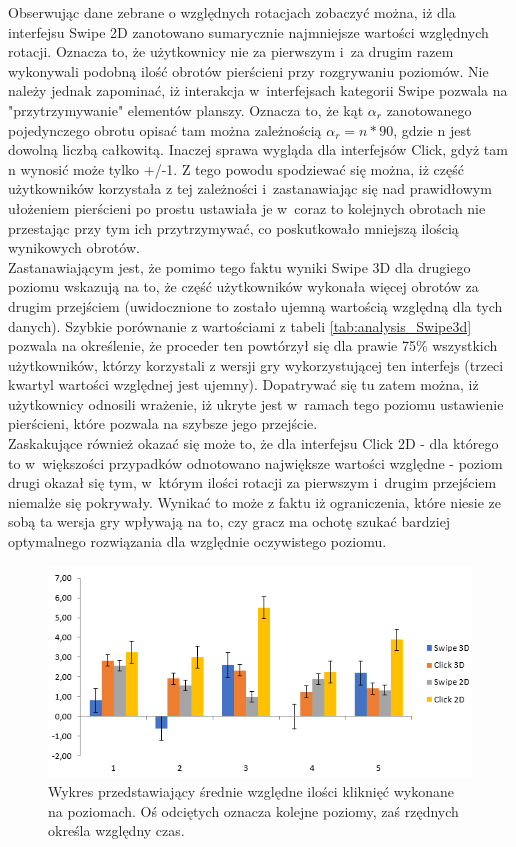 \documentclass[a4paper,12pt,numbers=noenddot]{report}
\begin{document}
Obserwując dane zebrane o względnych rotacjach zobaczyć można, iż dla interfejsu Swipe 2D zanotowano sumarycznie najmniejsze wartości względnych rotacji. Oznacza to, że użytkownicy nie za pierwszym i~za drugim razem wykonywali podobną ilość obrotów pierścieni przy rozgrywaniu poziomów. Nie należy jednak zapominać, iż interakcja w~interfejsach kategorii Swipe pozwala na "przytrzymywanie" elementów planszy. Oznacza to, że kąt $\alpha_r$ zanotowanego pojedynczego obrotu opisać tam można zależnością $\alpha_r = n * 90$, gdzie n jest dowolną liczbą całkowitą. Inaczej sprawa wygląda dla interfejsów Click, gdyż tam n wynosić może tylko +/-1. Z tego powodu spodziewać się można, iż część użytkowników korzystała z tej zależności i~zastanawiając się nad prawidłowym ułożeniem pierścieni po prostu ustawiała je w~coraz to kolejnych obrotach nie przestając przy tym ich przytrzymywać, co poskutkowało mniejszą ilością wynikowych obrotów. \\
Zastanawiającym jest, że pomimo tego faktu wyniki Swipe 3D dla drugiego poziomu wskazują na to, że część użytkowników wykonała więcej obrotów za drugim przejściem (uwidocznione to zostało ujemną wartością względną dla tych danych). Szybkie porównanie z wartościami z tabeli \ref{tab:analysis_Swipe3d} pozwala na określenie, że proceder ten powtórzył się dla prawie 75\% wszystkich użytkowników, którzy korzystali z wersji gry wykorzystującej ten interfejs (trzeci kwartyl wartości względnej jest ujemny). Dopatrywać się tu zatem można, iż użytkownicy odnosili wrażenie, iż ukryte jest w~ramach tego poziomu ustawienie pierścieni, które pozwala na szybsze jego przejście. \\
Zaskakujące również okazać się może to, że dla interfejsu Click 2D - dla którego to w~większości przypadków odnotowano największe wartości względne - poziom drugi okazał się tym, w~którym ilości rotacji za pierwszym i~drugim przejściem niemalże się pokrywały. Wynikać to może z faktu iż ograniczenia, które niesie ze sobą ta wersja gry wpływają na to, czy gracz ma ochotę szukać bardziej optymalnego rozwiązania dla względnie oczywistego poziomu.

\begin{figure}[h!]
	\centering
  	\includegraphics[width=0.9\linewidth]{diag/rel_mean_Clicks.png}
	\caption{Wykres przedstawiający średnie względne ilości kliknięć wykonane na poziomach. Oś odciętych oznacza kolejne poziomy, zaś rzędnych określa względny czas.}
	\label{fig:diag:rel:mean_Clicks}
\end{figure}
\end{document}

